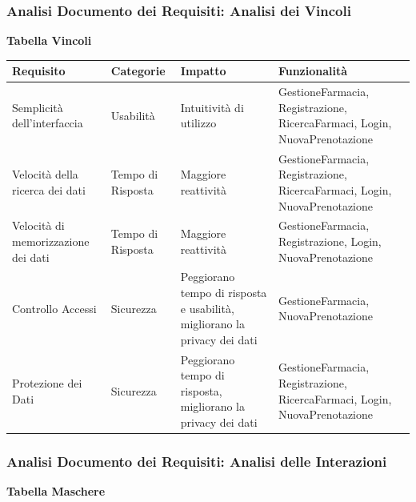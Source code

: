 \newpage
\subsubsection{Analisi Documento dei Requisiti: Analisi dei Vincoli}
\hfill \break

\textbf{Tabella Vincoli}
\hfill \break

\begin{tabular} {|P{3cm}|P{2.5cm}|P{3.5cm}|P{6cm}|}
    \hline
    \textbf{Requisito} & \textbf{Categorie} & \textbf{Impatto} & \textbf{Funzionalità} \\
    \hline
    Semplicità dell'interfaccia & Usabilità & Intuitività di utilizzo &  GestioneFarmacia, Registrazione, RicercaFarmaci, Login, NuovaPrenotazione  \\
    \hline
    Velocità della ricerca dei dati & Tempo di Risposta & Maggiore reattività & GestioneFarmacia, Registrazione, RicercaFarmaci, Login, NuovaPrenotazione \\
    \hline
    Velocità di memorizzazione dei dati & Tempo di Risposta & Maggiore reattività & GestioneFarmacia, Registrazione, Login, NuovaPrenotazione \\
    \hline
    Controllo Accessi &  Sicurezza  &  Peggiorano tempo di risposta e usabilità, migliorano la privacy dei dati  &  GestioneFarmacia, NuovaPrenotazione  \\
    \hline
    Protezione dei Dati &  Sicurezza  &  Peggiorano tempo di risposta, migliorano la privacy dei dati  &  GestioneFarmacia, Registrazione, RicercaFarmaci, Login, NuovaPrenotazione  \\
    \hline
\end{tabular}

\newpage

\subsubsection{Analisi Documento dei Requisiti: Analisi delle Interazioni}
\hfill \break

\textbf{Tabella Maschere}
\hfill \break

